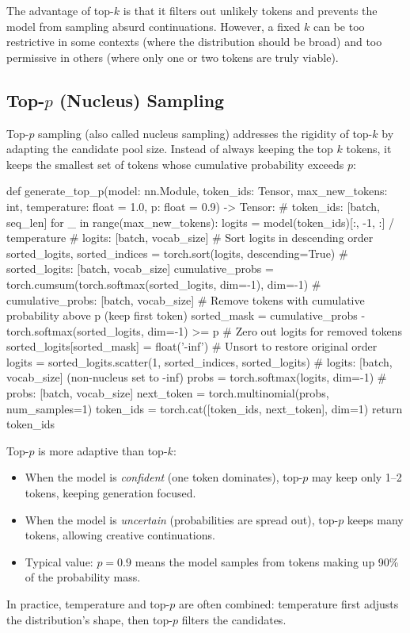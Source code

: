 The advantage of top-$k$ is that it filters out unlikely tokens and prevents
the model from sampling absurd continuations. However, a fixed $k$ can be too
restrictive in some contexts (where the distribution should be broad) and too
permissive in others (where only one or two tokens are truly viable).

\subsection{Top-$p$ (Nucleus) Sampling}

Top-$p$ sampling (also called nucleus sampling) addresses the rigidity of
top-$k$ by adapting the candidate pool size. Instead of always keeping the top
$k$ tokens, it keeps the smallest set of tokens whose cumulative probability
exceeds $p$:

\begin{pseudocode}
def generate_top_p(model: nn.Module, token_ids: Tensor,
                  max_new_tokens: int, temperature: float = 1.0,
                  p: float = 0.9) -> Tensor:
    # token_ids: [batch, seq_len]
    for _ in range(max_new_tokens):
        logits = model(token_ids)[:, -1, :] / temperature
        # logits: [batch, vocab_size]
        # Sort logits in descending order
        sorted_logits, sorted_indices = torch.sort(logits, descending=True)
        # sorted_logits: [batch, vocab_size]
        cumulative_probs = torch.cumsum(torch.softmax(sorted_logits, dim=-1), dim=-1)
        # cumulative_probs: [batch, vocab_size]
        # Remove tokens with cumulative probability above p (keep first token)
        sorted_mask = cumulative_probs - torch.softmax(sorted_logits, dim=-1) >= p
        # Zero out logits for removed tokens
        sorted_logits[sorted_mask] = float('-inf')
        # Unsort to restore original order
        logits = sorted_logits.scatter(1, sorted_indices, sorted_logits)
        # logits: [batch, vocab_size]  (non-nucleus set to -inf)
        probs = torch.softmax(logits, dim=-1)
        # probs: [batch, vocab_size]
        next_token = torch.multinomial(probs, num_samples=1)
        token_ids = torch.cat([token_ids, next_token], dim=1)
    return token_ids
\end{pseudocode}

\begin{keyconcept}
  Top-$p$ is more adaptive than top-$k$:
  \begin{itemize}
    \item When the model is \emph{confident} (one token dominates), top-$p$
          may keep only 1--2 tokens, keeping generation focused.
    \item When the model is \emph{uncertain} (probabilities are spread out),
          top-$p$ keeps many tokens, allowing creative continuations.
    \item Typical value: $p = 0.9$ means the model samples from tokens making
          up 90\% of the probability mass.
  \end{itemize}
  In practice, temperature and top-$p$ are often combined: temperature first
  adjusts the distribution's shape, then top-$p$ filters the candidates.
\end{keyconcept}


